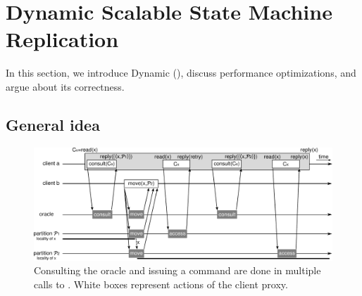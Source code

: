 \section{Dynamic Scalable State Machine Replication}

In this section, we introduce Dynamic \ssmr{} (\dssmr), discuss performance optimizations, and argue about its correctness.

\subsection{General idea}
\label{sec:generalidea}

%

\begin{figure}
\begin{minipage}[b]{1\linewidth} %
\centering
      \includegraphics[width=0.65\linewidth]{figures/move_case_1}
\end{minipage}
\caption{Consulting the oracle and issuing a command are done in multiple calls to \amcast{}. White boxes represent actions of the client proxy.}
\label{fig:move_case_1}
\end{figure}

